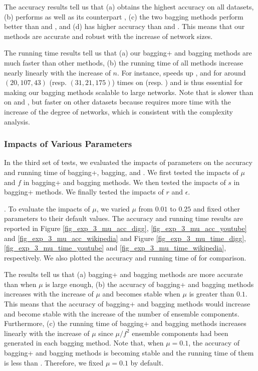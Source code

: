 The accuracy results tell us that (a) \Biased obtains the highest accuracy on all
datasets, (b) \Biasedp performs as well as its counterpart \Biased,
(c) the two bagging methods perform better than \Aa and \BIGCLAM,
and (d) \NMF has higher accuracy than \Aa and \BIGCLAM. This means that
our methods are accurate and robust with the increase of network sizes.

The running time results tell us that (a) our bagging+ and bagging methods are much faster than other methods,
(b) the running time of all methods increase nearly linearly with the increase of $n$. For
instance, \Biasedp speeds up \NMF, \Aa and \BIGCLAM for around $(20, 107, 43)$ (resp. $(31, 21, 175)$)
times on \Twitter (resp. \Friendster) and is thus essential for
making our bagging methods scalable to large networks. Note
that \NMF is slower than \BIGCLAM on \Digg and \YouTube,
but faster on other datasets because \BIGCLAM requires more time with
the increase of the degree of networks, which is consistent with the complexity analysis.






\subsubsection{Impacts of Various Parameters}
In the third set of tests, we evaluated the impacts of parameters on
the accuracy and running time of bagging+, bagging, \NMF
and \BIGCLAM. We first tested the impacts of $\mu$ and $f$ in bagging+ and bagging methods.
We then tested the impacts of $s$ in bagging+ methods. We finally
tested the impacts of $r$ and $\epsilon$.


. To evaluate the impacts of $\mu$, we
varied $\mu$ from $0.01$ to $0.25$ and fixed other parameters to their
default values. The accuracy and running time results are reported in
Figure \ref{fig_exp_3_mu_acc_digg}, \ref{fig_exp_3_mu_acc_youtube} and
\ref{fig_exp_3_mu_acc_wikipedia} and Figure \ref{fig_exp_3_mu_time_digg},
\ref{fig_exp_3_mu_time_youtube} and \ref{fig_exp_3_mu_time_wikipedia},
respectively. We also plotted the accuracy and running time of \NMF for comparison.



The results tell us that (a) bagging+ and bagging methods are more accurate than
\NMF when $\mu$ is large enough, (b) the accuracy of bagging+ and bagging methods
increases with the increase of $\mu$ and becomes stable when $\mu$ is greater
than $0.1$. This means that the accuracy of bagging+ and bagging methods would
increase and become stable with the increase of the number of ensemble components.
Furthermore, (c) the running time of bagging+ and bagging methods increases linearly
with the increase of $\mu$ since $\mu / f^2$ ensemble components had been generated in each bagging
method. Note that, when $\mu = 0.1$, the accuracy of bagging+ and bagging methods
is becoming stable and the running time of them is less than \NMF.
Therefore, we fixed $\mu = 0.1$ by default.


